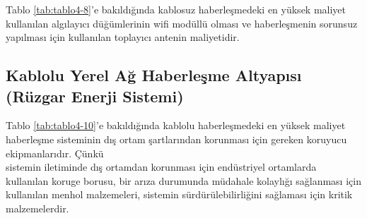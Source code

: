 Tablo \ref{tab:tablo4-8}’e bakıldığında kablosuz haberleşmedeki en yüksek maliyet kullanılan algılayıcı düğümlerinin \gls{wifi} modüllü olması ve haberleşmenin sorunsuz yapılması için kullanılan toplayıcı antenin maliyetidir. 


\subsection{Kablolu Yerel Ağ Haberleşme Altyapısı (Rüzgar Enerji Sistemi)}


 Tablo \ref{tab:tablo4-10}’e bakıldığında kablolu haberleşmedeki en yüksek maliyet haberleşme sisteminin dış ortam şartlarından korunması için gereken koruyucu ekipmanlarıdır. Çünkü\\ sistemin iletiminde dış ortamdan korunması için endüstriyel ortamlarda kullanılan koruge borusu, bir arıza durumunda müdahale kolaylığı sağlanması için kullanılan menhol malzemeleri, sistemin sürdürülebilirliğini sağlaması için kritik malzemelerdir.


